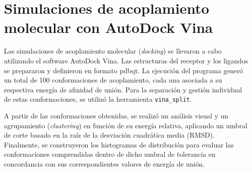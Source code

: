 \section{Simulaciones de acoplamiento molecular con AutoDock Vina}
Las simulaciones de acoplamiento molecular (\textit{docking}) se llevaron a cabo utilizando el software AutoDock Vina. Las estructuras del receptor y los ligandos se prepararon y definieron en formato pdbqt. La ejecución del programa generó un total de 100 conformaciones de acoplamiento, cada una asociada a su respectiva energía de afinidad de unión. Para la separación y gestión individual de estas conformaciones, se utilizó la herramienta \texttt{vina\_split}.

A partir de las conformaciones obtenidas, se realizó un análisis visual y un agrupamiento (\textit{clustering}) en función de su energía relativa, aplicando un umbral de corte basado en la raíz de la desviación cuadrática media (RMSD). Finalmente, se construyeron los histogramas de distribución para evaluar las conformaciones comprendidas dentro de dicho umbral de tolerancia en concordancia con sus correspondientes valores de energía de unión.


